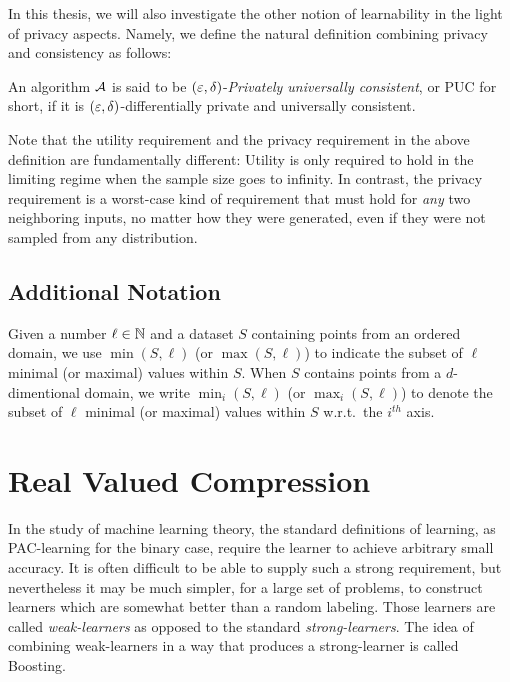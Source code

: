 \documentclass[12pt,a4paper,oneside,onecolumn]{book}
\begin{document}
In this thesis, we will also investigate the other notion of learnability in the light of privacy aspects. Namely, we define the natural definition combining privacy and consistency as follows:
\begin{definition}
An algorithm $\mathcal{A}$ is said to be $(\varepsilon,\delta)$-\emph{Privately universally consistent}, or PUC for short, 
if it is $(\varepsilon,\delta)$-differentially private and universally consistent.
\end{definition}

\begin{remark}
Note that the utility requirement and the privacy requirement in the above definition are fundamentally different: Utility is only required to hold in the limiting regime when the sample size goes to infinity. In contrast, the privacy requirement is a worst-case kind of requirement that must hold for {\em any} two neighboring inputs, no matter how they were generated, even if they were not sampled from any distribution. 
\end{remark}

\section{Additional Notation}

Given a number $\ell\in\mathbb{N}$ and a dataset $S$ containing points from an ordered domain,
we use $\min(S,\ell)$ (or $\max(S,\ell)$) 
to indicate the subset of $\ell$ minimal (or maximal) values within $S$.
When $S$ contains points from a $d$-dimentional domain, we write $\min_i(S,\ell)$ (or $\max_i(S,\ell)$) to denote the subset of $\ell$ minimal (or maximal) values within $S$ w.r.t.\ the $i^{th}$ axis.

\chapter{Real Valued Compression}

In the study of machine learning theory,
the standard definitions of learning,
as PAC-learning for the binary case,
require the learner to achieve arbitrary small accuracy.
It is often difficult to be able to supply such a strong requirement,
but nevertheless it may be much simpler,
for a large set of problems,
to construct learners which are somewhat
better than a random labeling.
Those learners are called \emph{weak-learners} as opposed
to the standard \emph{strong-learners}.
The idea of combining weak-learners in a way that produces a strong-learner is called Boosting. 
\end{document}
